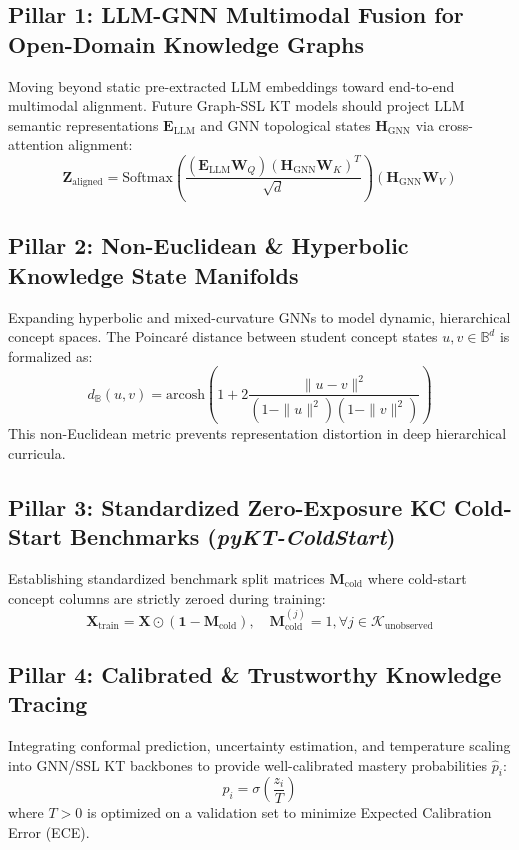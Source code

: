 \documentclass[10pt,journal,compsoc]{IEEEtran}
\begin{document}
\subsection{Pillar 1: LLM-GNN Multimodal Fusion for Open-Domain Knowledge Graphs}
Moving beyond static pre-extracted LLM embeddings toward end-to-end multimodal alignment. Future Graph-SSL KT models should project LLM semantic representations $\mathbf{E}_{\text{LLM}}$ and GNN topological states $\mathbf{H}_{\text{GNN}}$ via cross-attention alignment:
\begin{equation}
\mathbf{Z}_{\text{aligned}} = \text{Softmax}\left(\frac{(\mathbf{E}_{\text{LLM}}\mathbf{W}_Q)(\mathbf{H}_{\text{GNN}}\mathbf{W}_K)^T}{\sqrt{d}}\right) (\mathbf{H}_{\text{GNN}}\mathbf{W}_V)
\end{equation}

\subsection{Pillar 2: Non-Euclidean \& Hyperbolic Knowledge State Manifolds}
Expanding hyperbolic and mixed-curvature GNNs to model dynamic, hierarchical concept spaces. The Poincaré distance between student concept states $u, v \in \mathbb{B}^d$ is formalized as:
\begin{equation}
d_{\mathbb{B}}(u, v) = \text{arcosh}\left(1 + 2 \frac{\|u - v\|^2}{(1 - \|u\|^2)(1 - \|v\|^2)}\right)
\end{equation}
This non-Euclidean metric prevents representation distortion in deep hierarchical curricula.

\subsection{Pillar 3: Standardized Zero-Exposure KC Cold-Start Benchmarks (\emph{pyKT-ColdStart})}
Establishing standardized benchmark split matrices $\mathbf{M}_{\text{cold}}$ where cold-start concept columns are strictly zeroed during training:
\begin{equation}
\mathbf{X}_{\text{train}} = \mathbf{X} \odot (\mathbf{1} - \mathbf{M}_{\text{cold}}), \quad \mathbf{M}_{\text{cold}}^{(j)} = 1, \forall j \in \mathcal{K}_{\text{unobserved}}
\end{equation}

\subsection{Pillar 4: Calibrated \& Trustworthy Knowledge Tracing}
Integrating conformal prediction, uncertainty estimation, and temperature scaling into GNN/SSL KT backbones to provide well-calibrated mastery probabilities $\hat{p}_i$:
\begin{equation}
\hat{p}_i = \sigma\left(\frac{z_i}{T}\right)
\end{equation}
where $T > 0$ is optimized on a validation set to minimize Expected Calibration Error (ECE).
\end{document}
